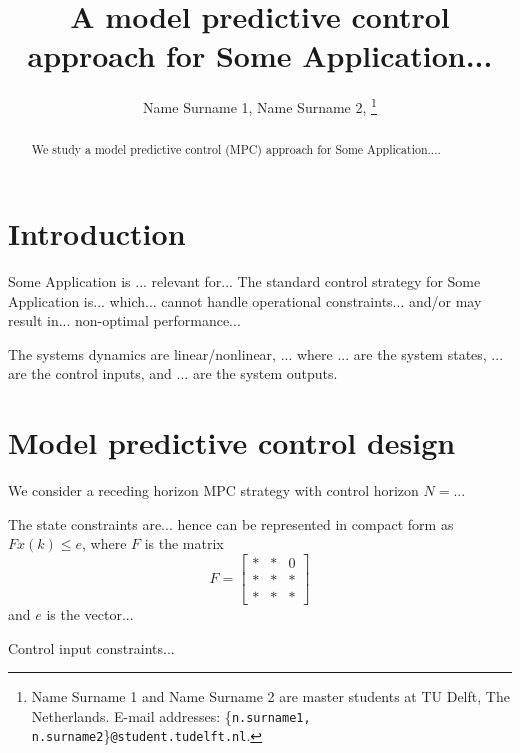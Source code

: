 \documentclass[10pt,twocolumn,twoside]{IEEEtran}
\date{ }
\begin{document}
\title{A model predictive control approach for Some Application...}

\author{Name Surname 1, Name Surname 2, 
\thanks{Name Surname 1 and Name Surname 2 are master students at TU Delft, The Netherlands. 
E-mail addresses: \{\texttt{n.surname1, n.surname2}\}\texttt{@student.tudelft.nl}. \smallskip
}
}
\maketitle         



\begin{abstract}
We study a model predictive control (MPC) approach for Some Application....
\end{abstract}

\section{Introduction} \label{sec:intro}
Some Application is ... relevant for... The standard control strategy for Some Application is... which... cannot handle operational constraints... and/or may result in... non-optimal performance...

The systems dynamics are linear/nonlinear, ... where ... are the system states, ... are the control inputs, and ... are the system outputs.

\section{Model predictive control design}

We consider a receding horizon MPC strategy with control horizon $N=...$

The state constraints are... hence can be represented in compact form as $F x(k) \leq e$, where $F$ is the matrix 
$$ F = \left[
\begin{matrix}
* & * & 0 \\
* & * & * \\
* & * & *
\end{matrix}
\right]
 $$
and $e$ is the vector...

Control input constraints...
\end{document}

